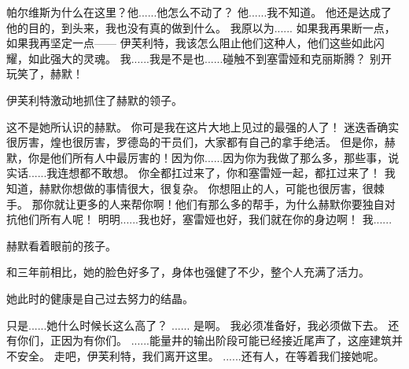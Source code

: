 \documentclass[openany]{book}
\begin{document}
\begin{dialogue}
     帕尔维斯为什么在这里？他......他怎么不动了？
     他......我不知道。
     他还是达成了他的目的，到头来，我也没有真的做到什么。
     我原以为......
     如果我再果断一点，如果我再坚定一点——
     伊芙利特，我该怎么阻止他们这种人，他们这些如此闪耀，如此强大的灵魂。
     我......我是不是也......碰触不到塞雷娅和克丽斯腾？
     别开玩笑了，赫默！\par
    伊芙利特激动地抓住了赫默的领子。\par
    这不是她所认识的赫默。
     你可是我在这片大地上见过的最强的人了！
     迷迭香确实很厉害，煌也很厉害，罗德岛的干员们，大家都有自己的拿手绝活。
     但是你，赫默，你是他们所有人中最厉害的！因为你......因为你为我做了那么多，那些事，说实话......我连想都不敢想。
     你全都扛过来了，你和塞雷娅一起，都扛过来了！
     我知道，赫默你想做的事情很大，很复杂。
     你想阻止的人，可能也很厉害，很棘手。
     那你就让更多的人来帮你啊！他们有那么多的帮手，为什么赫默你要独自对抗他们所有人呢！
     明明......我也好，塞雷娅也好，我们就在你的身边啊！
     我......\par
    赫默看着眼前的孩子。\par
    和三年前相比，她的脸色好多了，身体也强健了不少，整个人充满了活力。\par
    她此时的健康是自己过去努力的结晶。\par
    只是......她什么时候长这么高了？
     ......
     是啊。
     我必须准备好，我必须做下去。
     还有你们，正因为有你们。
     ......能量井的输出阶段可能已经接近尾声了，这座建筑并不安全。
     走吧，伊芙利特，我们离开这里。
     ......还有人，在等着我们接她呢。
\end{dialogue}
\end{document}
